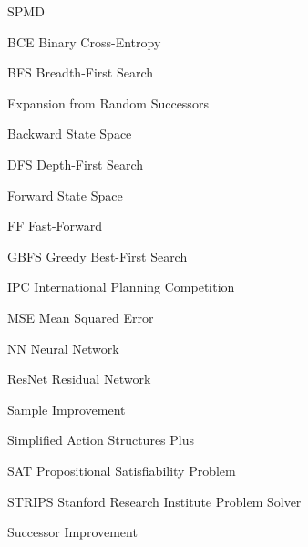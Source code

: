 \documentclass[ppgc,diss,english]{iiufrgs}
\begin{document}
\begin{listofabbrv}{SPMD}
        \item[BCE] Binary Cross-Entropy
        \item[BFS] Breadth-First Search
        \item[\bfsrs] Expansion from Random Successors
        \item[\bsp] Backward State Space
        \item[DFS] Depth-First Search
        \item[\fsp] Forward State Space
        \item[FF] Fast-Forward
        \item[GBFS] Greedy Best-First Search
        \item[IPC] International Planning Competition
        \item[MSE] Mean Squared Error
        \item[NN]  Neural Network
        \item[ResNet] Residual Network
        \item[\sai] Sample Improvement
        \item[\sas] Simplified Action Structures Plus
        \item[SAT] Propositional Satisfiability Problem
        \item[STRIPS] Stanford Research Institute Problem Solver
        \item[\sui] Successor Improvement
\end{listofabbrv}
\end{document}
